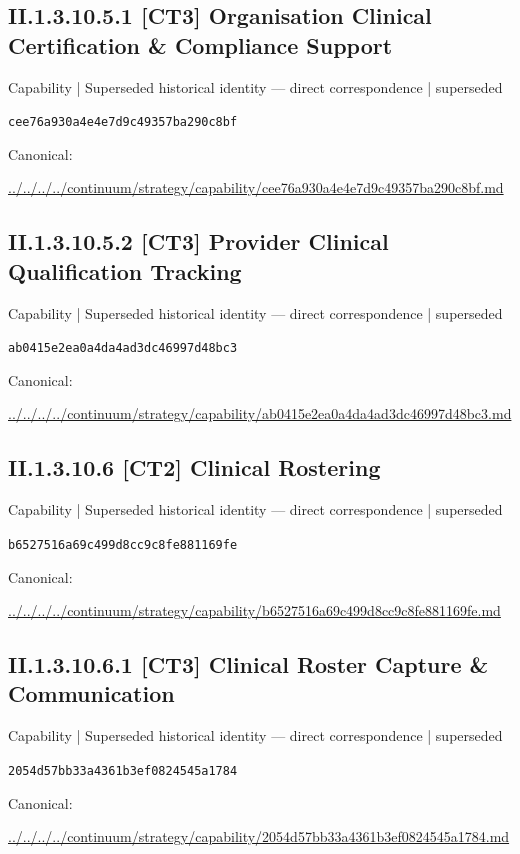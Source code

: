 \documentclass[10pt,a4paper]{article}
\begin{document}
\subsection*{II.1.3.10.5.1 [CT3] Organisation Clinical Certification \& Compliance Support}
{\small Capability | Superseded historical identity — direct correspondence | superseded}\par
\texttt{cee76a930a4e4e7d9c49357ba290c8bf}\par
Canonical: \par
{\footnotesize\url{../../../../continuum/strategy/capability/cee76a930a4e4e7d9c49357ba290c8bf.md}}\par
\subsection*{II.1.3.10.5.2 [CT3] Provider Clinical Qualification Tracking}
{\small Capability | Superseded historical identity — direct correspondence | superseded}\par
\texttt{ab0415e2ea0a4da4ad3dc46997d48bc3}\par
Canonical: \par
{\footnotesize\url{../../../../continuum/strategy/capability/ab0415e2ea0a4da4ad3dc46997d48bc3.md}}\par
\subsection*{II.1.3.10.6 [CT2] Clinical Rostering}
{\small Capability | Superseded historical identity — direct correspondence | superseded}\par
\texttt{b6527516a69c499d8cc9c8fe881169fe}\par
Canonical: \par
{\footnotesize\url{../../../../continuum/strategy/capability/b6527516a69c499d8cc9c8fe881169fe.md}}\par
\subsection*{II.1.3.10.6.1 [CT3] Clinical Roster Capture \& Communication}
{\small Capability | Superseded historical identity — direct correspondence | superseded}\par
\texttt{2054d57bb33a4361b3ef0824545a1784}\par
Canonical: \par
{\footnotesize\url{../../../../continuum/strategy/capability/2054d57bb33a4361b3ef0824545a1784.md}}\par
\end{document}
